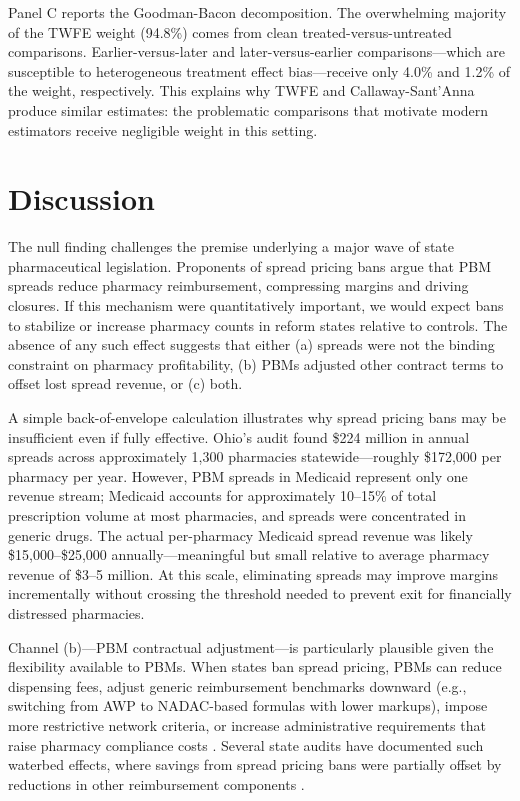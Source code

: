 \documentclass[12pt]{article}
\begin{document}
Panel C reports the Goodman-Bacon decomposition. The overwhelming majority of the TWFE weight (94.8\%) comes from clean treated-versus-untreated comparisons. Earlier-versus-later and later-versus-earlier comparisons---which are susceptible to heterogeneous treatment effect bias---receive only 4.0\% and 1.2\% of the weight, respectively. This explains why TWFE and Callaway-Sant'Anna produce similar estimates: the problematic comparisons that motivate modern estimators receive negligible weight in this setting.

\section{Discussion}

The null finding challenges the premise underlying a major wave of state pharmaceutical legislation. Proponents of spread pricing bans argue that PBM spreads reduce pharmacy reimbursement, compressing margins and driving closures. If this mechanism were quantitatively important, we would expect bans to stabilize or increase pharmacy counts in reform states relative to controls. The absence of any such effect suggests that either (a) spreads were not the binding constraint on pharmacy profitability, (b) PBMs adjusted other contract terms to offset lost spread revenue, or (c) both.

A simple back-of-envelope calculation illustrates why spread pricing bans may be insufficient even if fully effective. Ohio's audit found \$224 million in annual spreads across approximately 1,300 pharmacies statewide---roughly \$172,000 per pharmacy per year. However, PBM spreads in Medicaid represent only one revenue stream; Medicaid accounts for approximately 10--15\% of total prescription volume at most pharmacies, and spreads were concentrated in generic drugs. The actual per-pharmacy Medicaid spread revenue was likely \$15,000--\$25,000 annually---meaningful but small relative to average pharmacy revenue of \$3--5 million. At this scale, eliminating spreads may improve margins incrementally without crossing the threshold needed to prevent exit for financially distressed pharmacies.

Channel (b)---PBM contractual adjustment---is particularly plausible given the flexibility available to PBMs. When states ban spread pricing, PBMs can reduce dispensing fees, adjust generic reimbursement benchmarks downward (e.g., switching from AWP to NADAC-based formulas with lower markups), impose more restrictive network criteria, or increase administrative requirements that raise pharmacy compliance costs \citep{vandervelde2018pbm}. Several state audits have documented such waterbed effects, where savings from spread pricing bans were partially offset by reductions in other reimbursement components \citep{kentucky2020pbm}.
\end{document}

